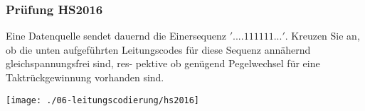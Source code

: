 \subsubsection{Prüfung HS2016}
Eine Datenquelle sendet dauernd die Einersequenz $'....1 1 1 1 1 1 ...'$. Kreuzen Sie an, ob die unten aufgeführten Leitungscodes für diese Sequenz annähernd gleichspannungsfrei sind, res-
pektive ob genügend Pegelwechsel für eine Taktrückgewinnung vorhanden sind.
\begin{center}
    \vspace{-8pt}
    \texttt{[image: ./06-leitungscodierung/hs2016]}
    \vspace{-8pt}
\end{center}
